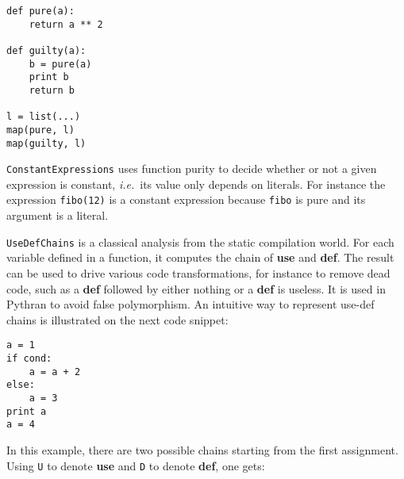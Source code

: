 \documentclass[10pt, onecolumn, preprint]{sigplanconf}
\providecommand{\ie}[1][~]{\textit{i.e.}#1}
\begin{document}
\begin{lstlisting}
def pure(a):
    return a ** 2

def guilty(a):
    b = pure(a)
    print b
    return b

l = list(...)
map(pure, l)
map(guilty, l)
\end{lstlisting}

\texttt{ConstantExpressions} uses function purity to decide whether or not a given expression
is constant, \ie{its value only depends on literals}. For instance the
expression \texttt{fibo(12)} is a constant expression because \texttt{fibo} is pure and its
argument is a literal. 

\texttt{UseDefChains} is a classical analysis from the static compilation world. For
each variable defined in a function, it computes the chain of \textbf{use} and \textbf{def}.
The result can be used to drive various code transformations, for instance to
remove dead code, such as a \textbf{def} followed by either nothing or a 
\textbf{def} is useless. 
It is used in Pythran to avoid false polymorphism. An intuitive way to represent
use-def chains is illustrated on the next code snippet:

\begin{lstlisting}
a = 1
if cond:
    a = a + 2
else:
    a = 3
print a
a = 4
\end{lstlisting}

In this example, there are two possible chains starting from the first
assignment. Using \texttt{U} to denote \textbf{use} and \texttt{D} to denote \textbf{def}, one gets:

\begin{center}
\end{center}
\end{document}
